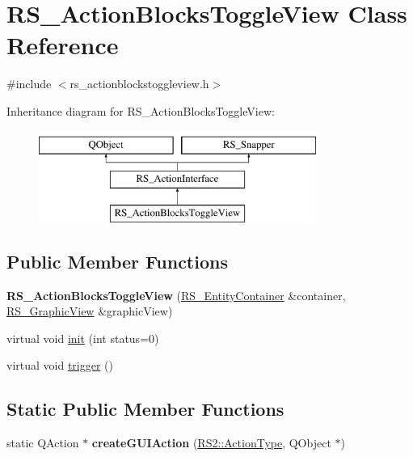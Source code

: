 \hypertarget{classRS__ActionBlocksToggleView}{\section{R\-S\-\_\-\-Action\-Blocks\-Toggle\-View Class Reference}
\label{classRS__ActionBlocksToggleView}
}


{\ttfamily \#include $<$rs\-\_\-actionblockstoggleview.\-h$>$}

Inheritance diagram for R\-S\-\_\-\-Action\-Blocks\-Toggle\-View\-:\begin{figure}[H]
\begin{center}
\leavevmode
\includegraphics[height=3.000000cm]{classRS__ActionBlocksToggleView}
\end{center}
\end{figure}
\subsection*{Public Member Functions}
\begin{DoxyCompactItemize}
\item 
\hypertarget{classRS__ActionBlocksToggleView_acd701a128b0e3ba46e523187d02f3645}{{\bfseries R\-S\-\_\-\-Action\-Blocks\-Toggle\-View} (\hyperlink{classRS__EntityContainer}{R\-S\-\_\-\-Entity\-Container} \&container, \hyperlink{classRS__GraphicView}{R\-S\-\_\-\-Graphic\-View} \&graphic\-View)}\label{classRS__ActionBlocksToggleView_acd701a128b0e3ba46e523187d02f3645}

\item 
virtual void \hyperlink{classRS__ActionBlocksToggleView_a5aea3008bc4861591c1f4514ffe1d0ef}{init} (int status=0)
\item 
virtual void \hyperlink{classRS__ActionBlocksToggleView_a43f3d67b4c695cc34a676559fcd8da1a}{trigger} ()
\end{DoxyCompactItemize}
\subsection*{Static Public Member Functions}
\begin{DoxyCompactItemize}
\item 
\hypertarget{classRS__ActionBlocksToggleView_a81ce4517731af7f489c7a7cba5ef3aa1}{static Q\-Action $\ast$ {\bfseries create\-G\-U\-I\-Action} (\hyperlink{classRS2_afe3523e0bc41fd637b892321cfc4b9d7}{R\-S2\-::\-Action\-Type}, Q\-Object $\ast$)}\label{classRS__ActionBlocksToggleView_a81ce4517731af7f489c7a7cba5ef3aa1}

\end{DoxyCompactItemize}
